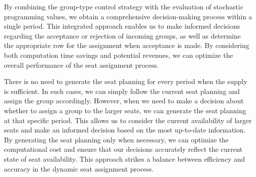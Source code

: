 


By combining the group-type control strategy with the evaluation of stochastic programming values, we obtain a comprehensive decision-making process within a single period. This integrated approach enables us to make informed decisions regarding the acceptance or rejection of incoming groups, as well as determine the appropriate row for the assignment when acceptance is made. By considering both computation time savings and potential revenues, we can optimize the overall performance of the seat assignment process.

There is no need to generate the seat planning for every period when the supply is sufficient. In such cases, we can simply follow the current seat planning and assign the group accordingly. However, when we need to make a decision about whether to assign a group to the larger seats, we can generate the seat planning at that specific period. This allows us to consider the current availability of larger seats and make an informed decision based on the most up-to-date information.
By generating the seat planning only when necessary, we can optimize the computational cost and ensure that our decisions accurately reflect the current state of seat availability. This approach strikes a balance between efficiency and accuracy in the dynamic seat assignment process.




